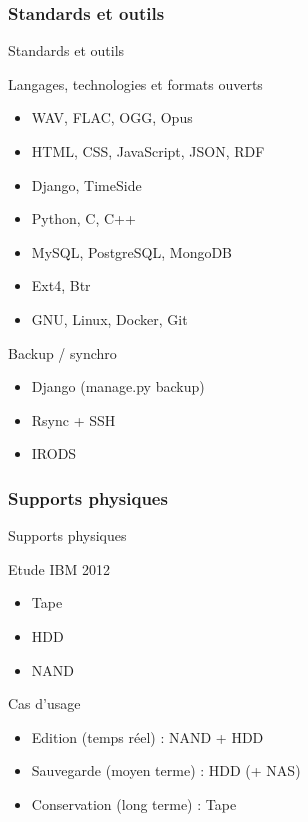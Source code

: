 \documentclass[final, hyperref, table]{beamer}
\begin{document}
\subsubsection{Standards et outils}
\begin{frame}{Standards et outils}
  \begin{block}{Langages, technologies et formats ouverts}
    \begin{itemize}
    \item WAV, FLAC, OGG, Opus
    \item HTML, CSS, JavaScript, JSON,  RDF
    \item Django, TimeSide
    \item Python, C, C++
    \item MySQL, PostgreSQL, MongoDB
    \item Ext4, Btr
    \item GNU, Linux, Docker, Git
    \end{itemize}
    \end{block}

  \begin{block}{Backup / synchro}%
    \begin{itemize}
    \item Django (manage.py backup)
    \item Rsync + SSH
    \item IRODS
    \end{itemize}
  \end{block}

\end{frame}

\subsubsection{Supports physiques}
\begin{frame}{Supports physiques}
  \begin{block}{Etude IBM 2012}
    \begin{itemize}
    \item Tape
    \item HDD
    \item NAND
    \end{itemize}
    \end{block}

\href{http://www.digitalpreservation.gov/meetings/documents/storage12/5-Fontana-StorageMediaDenstiyfoRNANDTAPE.pdf}{}

\begin{block}{Cas d'usage}
    \begin{itemize}
    \item Edition (temps réel) : NAND + HDD 
    \item Sauvegarde (moyen terme) : HDD (+ NAS)
    \item Conservation (long terme) : Tape
    \end{itemize}
    \end{block}
\end{frame}
\end{document}

